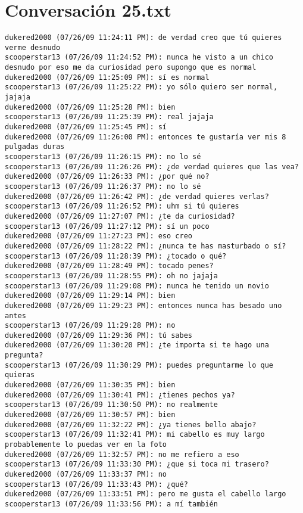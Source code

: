 \section{Conversaci\'on 25.txt}

\begin{verbatim}
dukered2000 (07/26/09 11:24:11 PM): de verdad creo que tú quieres verme desnudo
scooperstar13 (07/26/09 11:24:52 PM): nunca he visto a un chico desnudo por eso me da curiosidad pero supongo que es normal
dukered2000 (07/26/09 11:25:09 PM): sí es normal
scooperstar13 (07/26/09 11:25:22 PM): yo sólo quiero ser normal, jajaja
dukered2000 (07/26/09 11:25:28 PM): bien
scooperstar13 (07/26/09 11:25:39 PM): real jajaja
dukered2000 (07/26/09 11:25:45 PM): sí
dukered2000 (07/26/09 11:26:00 PM): entonces te gustaría ver mis 8 pulgadas duras
scooperstar13 (07/26/09 11:26:15 PM): no lo sé
scooperstar13 (07/26/09 11:26:26 PM): ¿de verdad quieres que las vea?
dukered2000 (07/26/09 11:26:33 PM): ¿por qué no?
scooperstar13 (07/26/09 11:26:37 PM): no lo sé
dukered2000 (07/26/09 11:26:42 PM): ¿de verdad quieres verlas?
scooperstar13 (07/26/09 11:26:52 PM): uhm si tú quieres
dukered2000 (07/26/09 11:27:07 PM): ¿te da curiosidad?
scooperstar13 (07/26/09 11:27:12 PM): sí un poco
dukered2000 (07/26/09 11:27:23 PM): eso creo
dukered2000 (07/26/09 11:28:22 PM): ¿nunca te has masturbado o sí?
scooperstar13 (07/26/09 11:28:39 PM): ¿tocado o qué?
dukered2000 (07/26/09 11:28:49 PM): tocado penes?
scooperstar13 (07/26/09 11:28:55 PM): oh no jajaja
scooperstar13 (07/26/09 11:29:08 PM): nunca he tenido un novio
dukered2000 (07/26/09 11:29:14 PM): bien
dukered2000 (07/26/09 11:29:23 PM): entonces nunca has besado uno antes
scooperstar13 (07/26/09 11:29:28 PM): no
dukered2000 (07/26/09 11:29:36 PM): tú sabes
dukered2000 (07/26/09 11:30:20 PM): ¿te importa si te hago una pregunta?
scooperstar13 (07/26/09 11:30:29 PM): puedes preguntarme lo que quieras
dukered2000 (07/26/09 11:30:35 PM): bien
dukered2000 (07/26/09 11:30:41 PM): ¿tienes pechos ya?
scooperstar13 (07/26/09 11:30:50 PM): no realmente
dukered2000 (07/26/09 11:30:57 PM): bien
dukered2000 (07/26/09 11:32:22 PM): ¿ya tienes bello abajo?
scooperstar13 (07/26/09 11:32:41 PM): mi cabello es muy largo probablemente lo puedas ver en la foto
dukered2000 (07/26/09 11:32:57 PM): no me refiero a eso
scooperstar13 (07/26/09 11:33:30 PM): ¿que si toca mi trasero?
dukered2000 (07/26/09 11:33:37 PM): no
scooperstar13 (07/26/09 11:33:43 PM): ¿qué?
dukered2000 (07/26/09 11:33:51 PM): pero me gusta el cabello largo
scooperstar13 (07/26/09 11:33:56 PM): a mí también

\end{verbatim}
